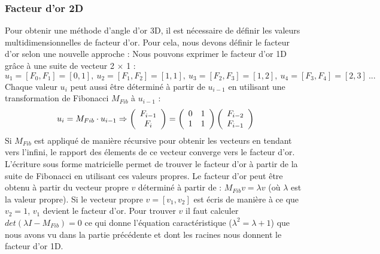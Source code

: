 \subsubsection{Facteur d'or 2D}

Pour obtenir une méthode d'angle d'or 3D, il est nécessaire de définir les valeurs multidimensionnelles de facteur d'or. Pour cela, nous devons définir le facteur d'or selon une nouvelle approche :  Nous pouvons exprimer le facteur d'or 1D grâce à une suite de vecteur 2 $\times$ 1 :
\begin{equation}
u_1=[F_0,F_1]=[0,1],\ 
u_2=[F_1,F_2]=[1,1],\ 
u_3=[F_2,F_3]=[1,2],\ 
u_4=[F_3,F_4]=[2,3] \ ...
\end{equation}
Chaque  valeur $u_i$ peut aussi être déterminé à partir de $u_{i-1}$ en utilisant une transformation de Fibonacci $M_{Fib}$ à $u_{i-1}$ :
\begin{equation}
u_i=M_{Fib} \cdot u_{i-1}\Rightarrow 
\left(
\begin{array}{c}
F_{i-1} \\
F_{i}
\end{array}
\right)=\left(
\begin{array}{c c}
0 & 1 \\
1 & 1
\end{array}
\right)\left(
\begin{array}{c}
F_{i-2} \\
F_{i-1}
\end{array}
\right)
\end{equation}
Si $M_{Fib}$ est appliqué de manière récursive pour obtenir les vecteurs en tendant vers l'infini, le rapport des élements de ce vecteur converge vers le facteur d'or. L'écriture sous forme matricielle permet de trouver le facteur d'or à partir de la suite de Fibonacci en utilisant ces valeurs propres. Le facteur d'or peut être obtenu à partir du vecteur propre $v$ déterminé à partir de : $M_{Fib} v=\lambda v$ (où $\lambda$	est la valeur propre). Si le vecteur propre $v=[v_1,v_2]$ est écris de manière à ce que $v_2=1$, $v_1$ devient le facteur d'or. Pour trouver $v$ il faut calculer $det(\lambda I-M_{Fib})=0$ ce qui donne l'équation caractéristique ($\lambda ^2 = \lambda +1$) que nous avons vu dans la partie précédente et dont les racines nous donnent le facteur d'or 1D.

